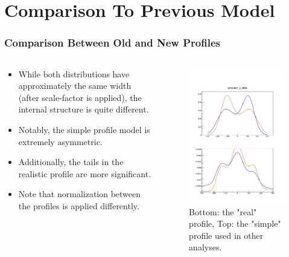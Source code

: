 \section{Comparison To Previous Model}
\label{ch:AmareshComparison}

\begin{frame}
\frametitle{Comparison Between Old and New Profiles}

\begin{columns}[onlytextwidth]
  \begin{column}{0.5\textwidth}
    \begin{itemize}
			\item While both distributions have approximately the same width (after
      scale-factor is applied), the internal structure is quite different.
      \item Notably, the simple profile model is extremely asymmetric.
			\item Additionally, the tails in the realistic profile are more
				significant.
			\item Note that normalization between the profiles is applied
				differently.
    \end{itemize}
  \end{column}

  \begin{column}{0.5\textwidth}
    \centering
    \begin{figure}
    \begin{center}
    \includegraphics[width=0.8\linewidth]{../AmareshComparison/figs/z_prof_comparison.pdf}
    \end{center}
    \caption{Bottom: the "real" profile, Top: the "simple" profile used in other analyses.}
    \label{fig:z_prof_comparison_amaresh_new}
    \end{figure}
  \end{column}


\end{columns}
\end{frame}
